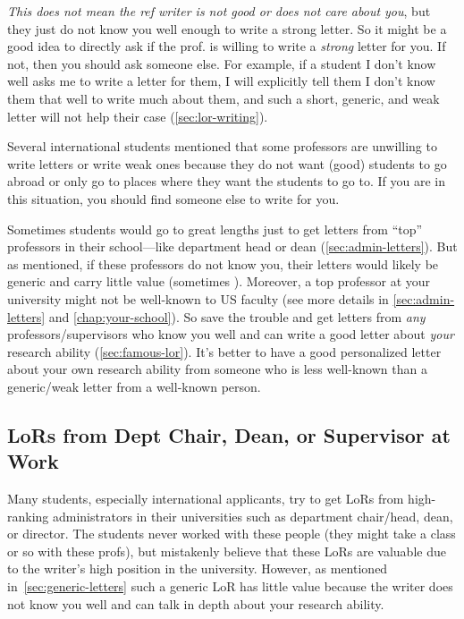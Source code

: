 \documentclass[oneside,11pt]{book}
\newenvironment{warningbox}[1][]{
  \small
  \begin{marker}[\faChessKing{}]
    {\textbf{#1}}
  }{
  \end{marker}
}
\newcommand{\red}[1]{{\color{red}{#1}}}
\begin{document}
  \emph{This does not mean the ref writer is not good or does not care about you}, but they just do not know you well enough to write a strong letter.
  So it might be a good idea to directly ask if the prof. is willing to write a \emph{strong} letter for you. If not, then you should ask someone else.  For example, if a student I don't know well asks me to write a letter for them, I will explicitly tell them I don't know them that well to write much about them, and such a short, generic, and weak letter will not help their case (\autoref{sec:lor-writing}).
  
  
  \begin{warningbox}
  Several international students mentioned that some professors are unwilling to write letters or write weak ones because they do not want (good) students to go abroad or only go to places where they want the students to go to. If you are in this situation, you should find someone else to write for you.
  \tcblower
  
  Sometimes students would go to great lengths just to get letters from ``top'' professors in their school---like department head or dean (\autoref{sec:admin-letters}). But as mentioned, if these professors do not know you, their letters would likely be generic and carry little value (sometimes \red{red flags}). Moreover, a top professor at your university might not be well-known to US faculty (see more details in \autoref{sec:admin-letters} and \autoref{chap:your-school}). So save the trouble and get letters from \emph{any} professors/supervisors who know you well and can write a good letter about \emph{your} research ability (\autoref{sec:famous-lor}). It's better to have a good personalized letter about your own research ability from someone who is less well-known than a generic/weak letter from a well-known person.
  \end{warningbox}

  
\subsection{LoRs from Dept Chair, Dean, or Supervisor at Work}\label{sec:admin-letters}

Many students, especially international applicants, try to get LoRs from high-ranking administrators in their universities such as department chair/head, dean, or director. The students never worked with these people (they might take a class or so with these profs), but mistakenly believe that these LoRs are valuable due to the writer's high position in the university.
However, as mentioned in~\autoref{sec:generic-letters} such a generic LoR has little value because the writer does not know you well and can talk in depth about your research ability. 
  
\end{document}

